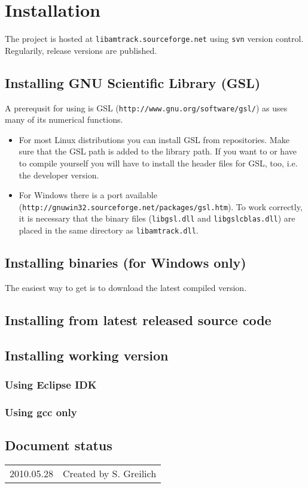 
\chapter{Installation}

The \la{} project is hosted at \texttt{libamtrack.sourceforge.net} using \texttt{svn} version control. Regularily, release versions are published.

\section{Installing GNU Scientific Library (GSL)}

A prerequsit for using \la{} is GSL (\texttt{http://www.gnu.org/software/gsl/}) as \la{} uses many of its numerical functions.

\begin{itemize}
\item{For most Linux distributions you can install GSL from repositories. Make sure that the GSL path is added to the library path. If you want to or have to compile \la{} yourself you will have to install the header files for GSL, too, i.e. the developer version.}
\item{For Windows there is a port available (\texttt{http://gnuwin32.sourceforge.net/packages/gsl.htm}). To work correctly, it is necessary that the binary files (\texttt{libgsl.dll} and \texttt{libgslcblas.dll}) are placed in the same directory as \texttt{libamtrack.dll}.}
\end{itemize}

\section{Installing \la{} binaries (for Windows only)}
The easiest way to get \la{} is to download the latest compiled version.

\section{Installing \la{} from latest released source code}

\section{Installing \la{} working version}

\subsection{Using Eclipse IDK}

\subsection{Using gcc only}



\section*{Document status}
\begin{tabular}{l l}
2010.05.28&Created by S. Greilich
\end{tabular}
